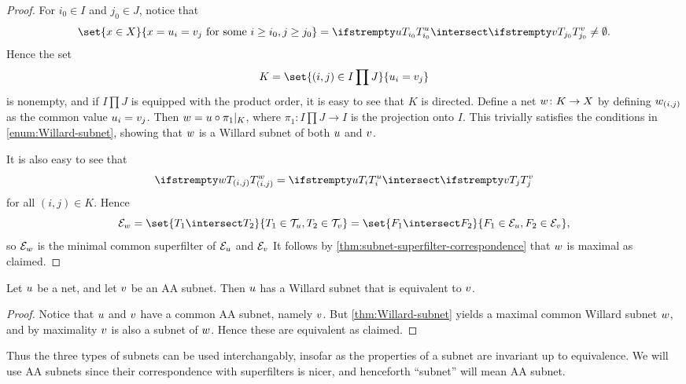\documentclass[article, a4paper, 11pt, oneside]{memoir}
\numberwithin{equation}{chapter}
\theoremstyle{nonumberplain}
\begin{document}
\begin{proof}
    For $i_0 \in I$ and $j_0 \in J$, notice that
    \begin{equation*}
        \set{x \in X}{x = \mynet_i = \altnet_j \text{ for some } i \geq i_0, j \geq j_0}
            = \tail[\mynet]{i_0} \intersect \tail[\altnet]{j_0}
            \neq \emptyset.
    \end{equation*}
    Hence the set
    \begin{equation*}
        K
            = \set{(i,j) \in I \prod J}{\mynet_i = \altnet_j}
    \end{equation*}
    is nonempty, and if $I \prod J$ is equipped with the product order, it is easy to see that $K$ is directed. Define a net $\newnet \colon K \to X$ by defining $\newnet_{(i,j)}$ as the common value $\mynet_i = \altnet_j$. Then $\newnet = \mynet \circ \pi_1|_K$, where $\pi_1 \colon I \prod J \to I$ is the projection onto $I$. This trivially satisfies the conditions in \cref{enum:Willard-subnet}, showing that $\newnet$ is a Willard subnet of both $\mynet$ and $\altnet$.
    
    It is also easy to see that
    \begin{equation*}
        \tail[\newnet]{(i,j)}
            = \tail[\mynet]{i} \intersect \tail[\altnet]{j}
    \end{equation*}
    for all $(i,j) \in K$. Hence
    \begin{equation*}
        \evfilt[w]
            = \set{T_1 \intersect T_2}{T_1 \in \tails{u}, T_2 \in \tails{v}}
            = \set{F_1 \intersect F_2}{F_1 \in \evfilt[u], F_2 \in \evfilt[v]},
    \end{equation*}
    so $\evfilt[w]$ is the minimal common superfilter of $\evfilt[u]$ and $\evfilt[v]$ It follows by \cref{thm:subnet-superfilter-correspondence} that $\newnet$ is maximal as claimed.
\end{proof}


\begin{corollary}
    Let $\mynet$ be a net, and let $\subnet$ be an AA subnet. Then $\mynet$ has a Willard subnet that is equivalent to $\subnet$.
\end{corollary}

\begin{proof}
    Notice that $\mynet$ and $\subnet$ have a common AA subnet, namely $\subnet$. But \cref{thm:Willard-subnet} yields a maximal common Willard subnet $\newnet$, and by maximality $\subnet$ is also a subnet of $\newnet$. Hence these are equivalent as claimed.
\end{proof}
%
Thus the three types of subnets can be used interchangably, insofar as the properties of a subnet are invariant up to equivalence. We will use AA subnets since their correspondence with superfilters is nicer, and henceforth \enquote{subnet} will mean AA subnet.
\end{document}
